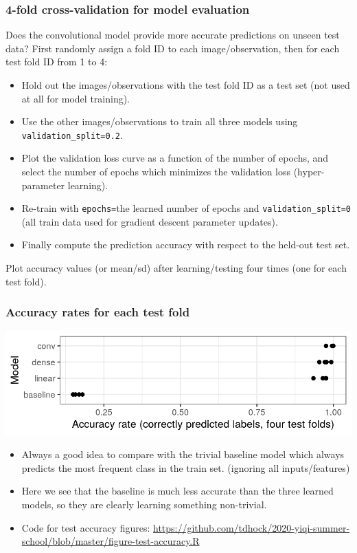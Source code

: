 \documentclass{beamer}
\begin{document}
\begin{frame}
  \frametitle{4-fold cross-validation for model evaluation}
  Does the convolutional model provide more accurate predictions on
  unseen test data? First randomly assign a fold ID to each image/observation,
  then for each test fold ID from 1 to 4:
  \begin{itemize}
  \item Hold out the images/observations with the test fold ID as a
    test set (not used at all for model training).
  \item Use the other images/observations to train all three models
    using \texttt{validation\_split=0.2}.
  \item Plot the validation loss curve as a function of the number of
    epochs, and select the number of epochs which minimizes the
    validation loss (hyper-parameter learning).
  \item Re-train with \texttt{epochs=}the learned number of epochs and
    \texttt{validation\_split=0} (all train data used for gradient
    descent parameter updates).
  \item Finally compute the prediction accuracy with respect to the
    held-out test set.
  \end{itemize}
  Plot accuracy values (or mean/sd) after learning/testing four times
  (one for each test fold).
\end{frame}
 
\begin{frame}
  \frametitle{Accuracy rates for each test fold}
  \includegraphics[width=\textwidth]{figure-test-accuracy-baseline}

  \begin{itemize}
  \item Always a good idea to compare with the trivial baseline model which always
    predicts the most frequent class in the train set. (ignoring all
    inputs/features) 
  \item Here we see that the baseline is much less accurate than the
    three learned models, so they are clearly learning something non-trivial.
  \item Code for test accuracy figures:
    \url{https://github.com/tdhock/2020-yiqi-summer-school/blob/master/figure-test-accuracy.R}
  \end{itemize}
\end{frame}
 
\end{document}
